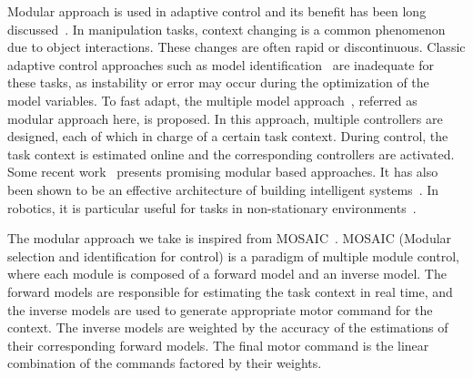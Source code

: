 Modular approach is used in adaptive control and its benefit has been long discussed~\cite{jacobs1991adaptive,narendra1997adaptive}.
In manipulation tasks, context changing is a common phenomenon due to object interactions. These changes are often rapid or discontinuous. Classic adaptive control approaches such as model identification~\cite{khalil2004modeling} are inadequate for these tasks, as instability or error may occur during the optimization of the model variables. To fast adapt, the multiple model approach~\cite{narendra1995adaptation}, referred as modular approach here, is proposed. In this approach, multiple controllers are designed, each of which in charge of a certain task context. During control, the task context is estimated online and the corresponding controllers are activated.  Some recent work~\cite{fekri2007robust,kuipers2010multiple} presents promising modular based approaches. It has also been shown to be an effective architecture of building intelligent systems~\cite{bryson2004modular,BrysonMcG12}. In robotics, it is particular useful for tasks in non-stationary environments~\cite{sugimoto2012emosaic}.



The modular approach we take is inspired from MOSAIC~\cite{haruno2001mosaic}. MOSAIC (Modular selection and identification for control) is a paradigm of multiple module control, where each module is composed of a forward model and an inverse model. The forward models are responsible for estimating the task context in real time, and the inverse models are used to generate appropriate motor command for the context. The inverse models are weighted by the accuracy of the estimations of their corresponding forward models. The final motor command is the linear combination of the commands factored by their weights.

